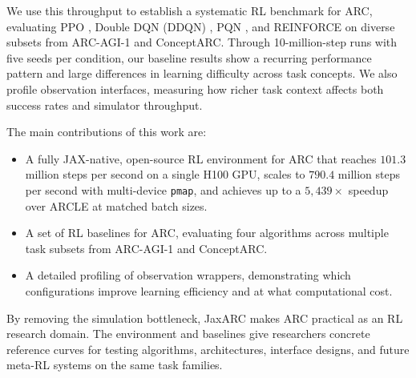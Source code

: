 We use this throughput to establish a systematic RL benchmark for ARC, evaluating PPO \citep{schulmanProximalPolicyOptimization2017}, Double DQN (DDQN) \citep{hasseltDeepReinforcementLearning2016}, PQN \citep{galliciSimplifyingDeepTemporal2025}, and REINFORCE \citep{williamsSimpleStatisticalGradientfollowing1992} on diverse subsets from ARC-AGI-1 and ConceptARC. Through 10-million-step runs with five seeds per condition, our baseline results show a recurring performance pattern and large differences in learning difficulty across task concepts. We also profile observation interfaces, measuring how richer task context affects both success rates and simulator throughput.

The main contributions of this work are:

\begin{itemize}
	\item A fully JAX-native, open-source RL environment for ARC that reaches $101.3$ million steps per second on a single H100 GPU, scales to $790.4$ million steps per second with multi-device \texttt{pmap}, and achieves up to a $5,439\times$ speedup over ARCLE at matched batch sizes.
	\item A set of RL baselines for ARC, evaluating four algorithms across multiple task subsets from ARC-AGI-1 and ConceptARC.
	\item A detailed profiling of observation wrappers, demonstrating which configurations improve learning efficiency and at what computational cost.
\end{itemize}

By removing the simulation bottleneck, JaxARC makes ARC practical as an RL research domain. The environment and baselines give researchers concrete reference curves for testing algorithms, architectures, interface designs, and future meta-RL systems on the same task families.
